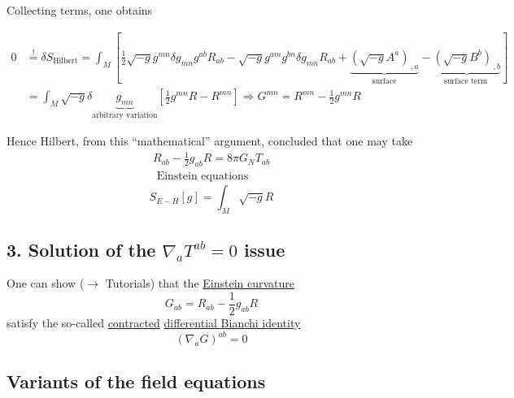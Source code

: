 	Collecting terms, one obtains
	
	\[
	\begin{aligned}
	0 & \overset{!}{=} \delta S_{\text{Hilbert}} = \int_M [ \frac{1}{2} \sqrt{-g} g^{mn} \delta g_{mn} g^{ab} R_{ab} - \sqrt{-g} g^{am} g^{bn} \delta g_{mn} R_{ab}+    \underbrace{ (\sqrt{-g}A^a)_{ \, , a} }_{ \text{surface} } - \underbrace{ ( \sqrt{-g} B^b)_{ \, , b } }_{ \text{surface term } } ] \\
	& = \int_M \sqrt{-g} \delta \underbrace{g_{mn}}_{ \text{arbitrary variation}} [ \frac{1}{2} g^{mn} R - R^{mn} ] \Longrightarrow G^{mn} = R^{mn} - \frac{1}{2} g^{mn} R
	\end{aligned}
	\]
	
	Hence Hilbert, from this ``mathematical'' argument, concluded that one may take
	\[
	\begin{gathered}
	\boxed{ R_{ab} - \frac{1}{2} g_{ab} R = 8 \pi G_N T_{ab} }  \\
	\text{ Einstein equations}
	\end{gathered}
	\]
	\[
	S_{E-H}[g] = \int_M \sqrt{-g}R
	\]
	
	\subsection{3. Solution of the $\nabla_a T^{ab} =0$ issue}
	
	One can show ($\to$ Tutorials) that the \underline{Einstein curvature}
	\[
	G_{ab} = R_{ab} - \frac{1}{2} g_{ab}R
	\]
	satisfy the so-called \underline{contracted} \underline{differential Bianchi identity}
	\[
	(\nabla_a G)^{ab} =0 
	\]
	
	\subsection{Variants of the field equations}
	
